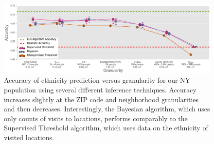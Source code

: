 \begin{figure}[t]
  \centering
  \includegraphics[width=\textwidth]{fig/footprints/last_big_plot.eps}
    \caption{Accuracy of ethnicity prediction versus granularity for our NY population using several different inference techniques. Accuracy increases slightly at the ZIP code and neighborhood granularities and then decreases. Interestingly, the Bayesian algorithm, which uses only counts of visits to locations, performs comparably to the Supervised Threshold algorithm, which uses data on the ethnicity of visited locations.}
    \label{fig:big_plot}
\end{figure}

